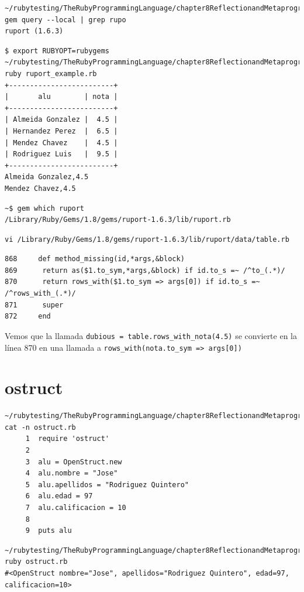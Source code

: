 \begin{verbatim}
~/rubytesting/TheRubyProgrammingLanguage/chapter8ReflectionandMetaprogramming$ gem query --local | grep rupo
ruport (1.6.3)
\end{verbatim}

\begin{verbatim}
$ export RUBYOPT=rubygems
~/rubytesting/TheRubyProgrammingLanguage/chapter8ReflectionandMetaprogramming$ ruby ruport_example.rb 
+-------------------------+
|       alu        | nota |
+-------------------------+
| Almeida Gonzalez |  4.5 |
| Hernandez Perez  |  6.5 |
| Mendez Chavez    |  4.5 |
| Rodriguez Luis   |  9.5 |
+-------------------------+
Almeida Gonzalez,4.5
Mendez Chavez,4.5

\end{verbatim}

\begin{verbatim}
~$ gem which ruport
/Library/Ruby/Gems/1.8/gems/ruport-1.6.3/lib/ruport.rb
\end{verbatim}

\begin{verbatim}
vi /Library/Ruby/Gems/1.8/gems/ruport-1.6.3/lib/ruport/data/table.rb
\end{verbatim}

\begin{verbatim}
868     def method_missing(id,*args,&block)
869      return as($1.to_sym,*args,&block) if id.to_s =~ /^to_(.*)/
870      return rows_with($1.to_sym => args[0]) if id.to_s =~ /^rows_with_(.*)/
871      super
872     end
\end{verbatim}

Vemos que la llamada \verb|dubious = table.rows_with_nota(4.5)|
se convierte en la línea 870 en una llamada a
\verb|rows_with(nota.to_sym => args[0])|

\section{ostruct}
\begin{verbatim}
~/rubytesting/TheRubyProgrammingLanguage/chapter8ReflectionandMetaprogramming$ cat -n ostruct.rb 
     1  require 'ostruct'
     2  
     3  alu = OpenStruct.new
     4  alu.nombre = "Jose"
     5  alu.apellidos = "Rodriguez Quintero"
     6  alu.edad = 97
     7  alu.calificacion = 10
     8  
     9  puts alu
\end{verbatim}

\begin{verbatim}
~/rubytesting/TheRubyProgrammingLanguage/chapter8ReflectionandMetaprogramming$ ruby ostruct.rb 
#<OpenStruct nombre="Jose", apellidos="Rodriguez Quintero", edad=97, calificacion=10>
\end{verbatim}

